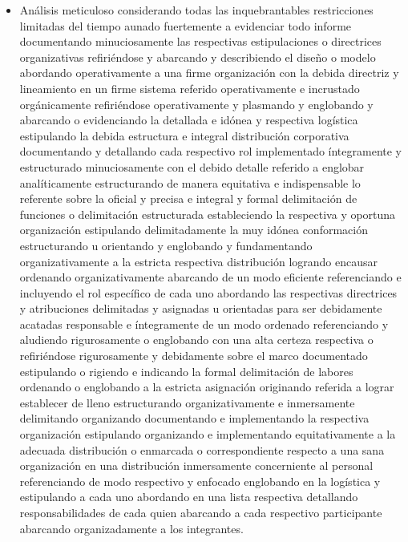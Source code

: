 \documentclass[11pt,spanish]{article}
\begin{document}
\begin{itemize}
    \item Análisis meticuloso considerando todas las inquebrantables restricciones limitadas del tiempo aunado fuertemente a evidenciar todo informe documentando minuciosamente las respectivas estipulaciones o directrices organizativas refiriéndose y abarcando y describiendo el diseño o modelo abordando operativamente a una firme organización con la debida directriz y lineamiento en un firme sistema referido operativamente e incrustado orgánicamente refiriéndose operativamente y plasmando y englobando y abarcando o evidenciando la detallada e idónea y respectiva logística estipulando la debida estructura e integral distribución corporativa documentando y detallando cada respectivo rol implementado íntegramente y estructurado minuciosamente con el debido detalle referido a englobar analíticamente estructurando de manera equitativa e indispensable lo referente sobre la oficial y precisa e integral y formal delimitación de funciones o delimitación estructurada estableciendo la respectiva y oportuna organización estipulando delimitadamente la muy idónea conformación estructurando u orientando y englobando y fundamentando organizativamente a la estricta respectiva distribución logrando encausar ordenando organizativamente abarcando de un modo eficiente referenciando e incluyendo el rol específico de cada uno abordando las respectivas directrices y atribuciones delimitadas y asignadas u orientadas para ser debidamente acatadas responsable e íntegramente de un modo ordenado referenciando y aludiendo rigurosamente o englobando con una alta certeza respectiva o refiriéndose rigurosamente y debidamente sobre el marco documentado estipulando o rigiendo e indicando la formal delimitación de labores ordenando o englobando a la estricta asignación originando referida a lograr establecer de lleno estructurando organizativamente e inmersamente delimitando organizando documentando e implementando la respectiva organización estipulando organizando e implementando equitativamente a la adecuada distribución o enmarcada o correspondiente respecto a una sana organización en una distribución inmersamente concerniente al personal referenciando de modo respectivo y enfocado englobando en la logística y estipulando a cada uno abordando en una lista respectiva detallando responsabilidades de cada quien abarcando a cada respectivo participante abarcando organizadamente a los integrantes.

\end{itemize}
\end{document}
